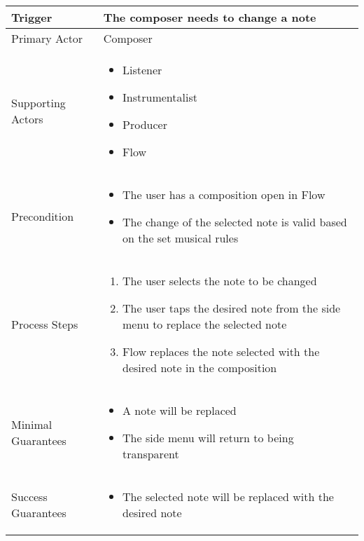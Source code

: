 \begin{longtable}{|X|X|}
\hline
Trigger & 
The composer needs to change a note \\
\hline
Primary Actor & 
Composer\\
\hline
Supporting Actors & 
\begin{itemize}
\item Listener
\item Instrumentalist
\item Producer
\item Flow
\end{itemize} \\
\hline
Precondition & 
\begin{itemize}
\item The user has a composition open in Flow  
\item The change of the selected note is valid based on the set musical rules
\end{itemize} \\
\hline
Process Steps & 
\begin{enumerate}
\item The user selects the note to be changed 
\item The user taps the desired note from the side menu to replace the selected note
\item Flow replaces the note selected with the desired note in the composition
\end{enumerate} \\
\hline
Minimal Guarantees & 
\begin{itemize}
  \item A note will be replaced
  \item The side menu will return to being transparent
\end{itemize} \\
\hline
Success Guarantees & 
\begin{itemize}
  \item The selected note will be replaced with the desired note
\end{itemize} \\
\hline
\end{longtable}